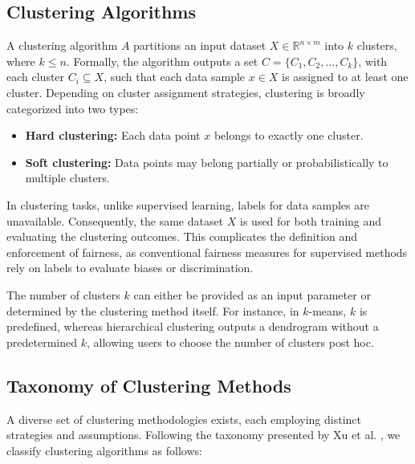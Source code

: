 \subsection{Clustering Algorithms}
A clustering algorithm \(A\) partitions an input dataset \(X \in
\mathbb{R}^{n \times m}\) into \(k\) clusters, where \(k \leq n\).
Formally, the algorithm outputs a set \(C = \{C_1, C_2, \dots,
C_k\}\), with each cluster \(C_i \subseteq X\), such that each data
sample \(x \in X\) is assigned to at least one cluster. Depending on
cluster assignment strategies, clustering is broadly categorized into two types:

\begin{itemize}
  \item \textbf{Hard clustering:} Each data point \(x\) belongs to
    exactly one cluster.
  \item \textbf{Soft clustering:} Data points may belong partially or
    probabilistically to multiple clusters.
\end{itemize}

In clustering tasks, unlike supervised learning, labels for data
samples are unavailable. Consequently, the same dataset \(X\) is used
for both training and evaluating the clustering outcomes. This
complicates the definition and enforcement of fairness, as
conventional fairness measures for supervised methods rely on labels
to evaluate biases or discrimination.

The number of clusters \(k\) can either be provided as an input
parameter or determined by the clustering method itself. For
instance, in \(k\)-means, \(k\) is predefined, whereas hierarchical
clustering outputs a dendrogram without a predetermined \(k\),
allowing users to choose the number of clusters post hoc.

\subsection{Taxonomy of Clustering Methods}
A diverse set of clustering methodologies exists, each employing
distinct strategies and assumptions. Following the taxonomy presented
by Xu et al. \cite{XuSurvey}, we classify clustering algorithms as follows:

